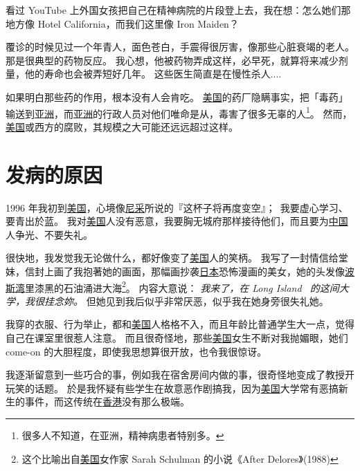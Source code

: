 \documentclass[12pt]{report}
\newcommand{\speechCn}[1]{\textrm{\textit{\textcolor{Speech}{#1}}}}
\begin{document}
{看过 YouTube 上外国女孩把自己在精神病院的片段登上去，我在想：怎么她们那地方像 Hotel California，而我们这里像 Iron Maiden？

覆诊的时候见过一个年青人，面色苍白，手震得很厉害，像那些心脏衰竭的老人。 那是很典型的药物反应。 我心想，他被药物弄成这样，必早死，就算将来减少剂量，他的寿命也会被弄短好几年。 这些医生简直是在慢性杀人....

如果明白那些药的作用，根本没有人会肯吃。 \uline{美国}的药厂隐瞒事实，把「毒药」输送到\uline{亚洲}，而\uline{亚洲}的行政人员对他们唯命是从，毒害了很多无辜的人\footnote{很多人不知道，在亚洲，精神病患者特别多。}。 然而，\uline{美国}或西方的腐败，其规模之大可能还远远超过这样。


\chapter{发病的原因}
\label{cause-of-illness}

1996 年我初到\uline{美国}，心境像\uline{尼采}所说的『这杯子将再度变空』；\ 我要虚心学习、要青出於蓝。 我对\uline{美国}人没有恶意，我要胸无城府那样接待他们，而且要为\uline{中国}人争光、不要失礼。

很快地，我发觉我无论做什么，都好像变了\uline{美国}人的笑柄。 我写了一封情信给堂妹，信封上画了我抱著她的画面，那幅画抄袭\uline{日本}恐怖漫画的美女，她的头发像\uline{波斯湾}里漆黑的石油涌进大海\footnote{这个比喻出自\uline{美国}女作家 Sarah Schulman 的小说《After Delores》(1988)}。 内容大意说： \speechCn{我来了，在 Long Island \ 的这间大学，我很挂念妳。}  但她见到我后似乎非常厌恶，似乎我在她身旁很失礼她。

我穿的衣服、行为举止，都和\uline{美国}人格格不入，而且年龄比普通学生大一点，觉得自己在课室里很惹人注意。 而且很奇怪地，那些\uline{美国}女生不断对我抛媚眼，她们 come-on 的大胆程度，即使我思想算很开放，也令我很惊讶。

我逐渐留意到一些巧合的事，例如我在宿舍房间内做的事，很奇怪地变成了教授开玩笑的话题。 於是我怀疑有些学生在故意恶作剧搞我，因为\uline{美国}大学常有恶搞新生的事件，而这传统在\uline{香港}没有那么极端。

}
\end{document}
